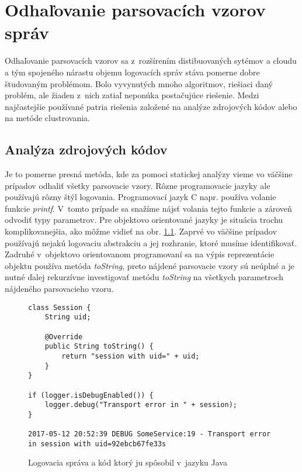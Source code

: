 \chapter{Odhaľovanie parsovacích vzorov správ}

Odhaľovanie parsovacích vzorov sa z~rozšírením distibuovaných sytémov a cloudu a tým spojeného nárastu objemu logovacích správ stáva pomerne dobre študovaným problémom. Bolo vyvynutých mnoho algoritmov, riešiaci daný problém, ale žiaden z~nich zatiaľ neponúka postačujúce riešenie. Medzi najčastejšie používané patria riešenia založené na analýze zdrojových kódov alebo na metóde clustrovania.

\section{Analýza zdrojových kódov}

Je to pomerne presná metóda, kde za pomoci statickej analýzy vieme vo väčšine prípadov odhaliť všetky parsovacie vzory.
Rôzne programovacie jazyky ale používajú rôzny štýl logovania. Programovací jazyk C napr. používa volanie funkcie \emph{printf}.
V~tomto prípade sa snažíme nájsť volania tejto funkcie a zároveň odvodiť typy parametrov.
Pre objektovo orientované jazyky je situácia trochu komplikovanejšia, ako môžme vidieť na obr. \ref{fig:static-analysis}. Zaprvé vo väčšine prípadov používajú nejakú logovaciu abstrakciu a jej rozhranie, ktoré musíme identifikovať. Zadruhé v~objektovo orientovanom programovaní sa na výpis reprezentácie objektu používa metóda \emph{toString}, preto nájdené parsovacie vzory sú neúplné a je nutné ďalej rekurzívne investigovať metódu \emph{toString} na všetkych parametroch nájdeného parsovacieho vzoru.

\begin{figure}[htbp]
\centering
\begin{minipage}{0.9\textwidth}
\lstset{tabsize=4,columns=flexible,breaklines=true,breakatwhitespace=true, showstringspaces=false}
\begin{lstlisting}
class Session {
	String uid;
	
	@Override
	public String toString() {
		return "session with uid=" + uid;
	}
}

if (logger.isDebugEnabled()) {
	logger.debug("Transport error in " + session);
}

2017-05-12 20:52:39 DEBUG SomeService:19 - Transport error in session with uid=92ebcb67fe33s
\end{lstlisting} 		
\end{minipage} 
\caption{Logovacia správa a kód ktorý ju spôsobil v~jazyku Java}
\label{fig:static-analysis}
\end{figure}

